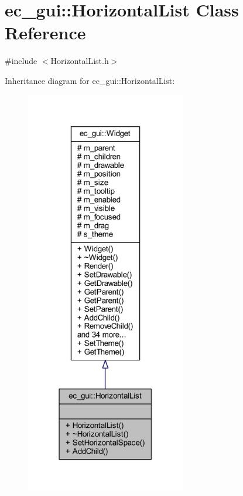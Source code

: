 \hypertarget{classec__gui_1_1_horizontal_list}{}\section{ec\+\_\+gui\+:\+:Horizontal\+List Class Reference}
\label{classec__gui_1_1_horizontal_list}


{\ttfamily \#include $<$Horizontal\+List.\+h$>$}



Inheritance diagram for ec\+\_\+gui\+:\+:Horizontal\+List\+:\nopagebreak
\begin{figure}[H]
\begin{center}
\leavevmode
\includegraphics[width=198pt]{classec__gui_1_1_horizontal_list__inherit__graph}
\end{center}
\end{figure}



